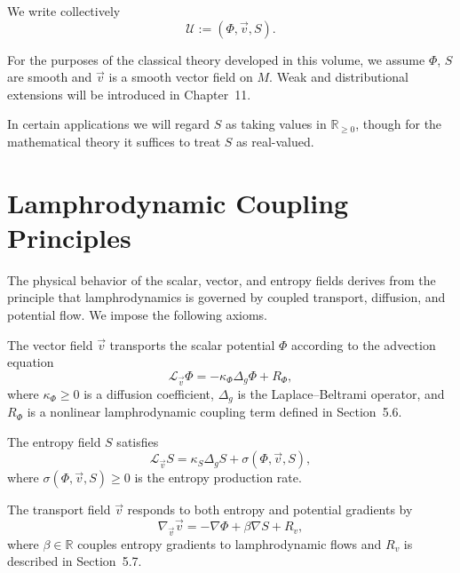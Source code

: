 We write collectively
\[
\mathcal{U} := (\Phi,\vec v,S).
\]

\begin{axiom}
For the purposes of the classical theory developed in this volume,
we assume $\Phi$, $S$ are smooth and $\vec v$ is a smooth vector field
on $M$. Weak and distributional extensions will be introduced in
Chapter~11.
\end{axiom}

\begin{remark}
In certain applications we will regard $S$ as taking values in
$\mathbb{R}_{\ge 0}$, though for the mathematical theory it suffices to
treat $S$ as real-valued.
\end{remark}


\section{Lamphrodynamic Coupling Principles}

The physical behavior of the scalar, vector, and entropy fields derives
from the principle that lamphrodynamics is governed by coupled 
transport, diffusion, and potential flow. We impose the following axioms.

\begin{axiom}
The vector field $\vec v$ transports the scalar potential $\Phi$
according to the advection equation
\begin{equation}
\label{eq:advect}
\mathcal{L}_{\vec v}\Phi = -\kappa_{\Phi}\Delta_g \Phi + R_{\Phi},
\end{equation}
where $\kappa_{\Phi}\ge 0$ is a diffusion coefficient,
$\Delta_g$ is the Laplace--Beltrami operator, and $R_{\Phi}$
is a nonlinear lamphrodynamic coupling term defined in
Section~5.6.
\end{axiom}

\begin{axiom}
The entropy field $S$ satisfies
\begin{equation}
\label{eq:entropy}
\mathcal{L}_{\vec v}S = \kappa_{S}\Delta_g S + \sigma(\Phi,\vec v,S),
\end{equation}
where $\sigma(\Phi,\vec v,S)\ge 0$ is the entropy production rate.
\end{axiom}

\begin{axiom}
The transport field $\vec v$ responds to both entropy and potential
gradients by
\begin{equation}
\label{eq:velocity}
\nabla_{\vec v}\vec v = -\nabla\Phi + \beta\nabla S + R_{v},
\end{equation}
where $\beta\in\mathbb{R}$ couples entropy gradients to lamphrodynamic
flows and $R_{v}$ is described in Section~5.7.
\end{axiom}

